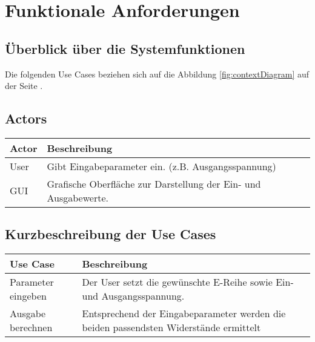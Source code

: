 \section{Funktionale Anforderungen}
\label{sec:funcReqs}




\subsection{Überblick über die Systemfunktionen}
Die folgenden Use Cases beziehen sich auf die Abbildung \ref{fig:contextDiagram} auf der Seite \pageref{fig:contextDiagram}.


\subsection{Actors}
\begin{tabular}{|l|l|}
	\hline
	\textbf{Actor} & \textbf{Beschreibung}\\
	\hline
	User & Gibt Eingabeparameter ein. (z.B. Ausgangsspannung)\\
	\hline
	GUI & Grafische Oberfläche zur Darstellung der Ein- und Ausgabewerte.\\
	\hline
	
\end{tabular}

\subsection{Kurzbeschreibung der Use Cases}
\begin{tabular}{|l|p{13cm}|}
	\hline
	\textbf{Use Case} & \textbf{Beschreibung}\\
	\hline
	Parameter eingeben & Der User setzt die gewünschte E-Reihe sowie Ein- und Ausgangsspannung.\\
	\hline
	Ausgabe berechnen & Entsprechend der Eingabeparameter werden die beiden passendsten Widerstände ermittelt\\
	\hline
\end{tabular}
\newpage

